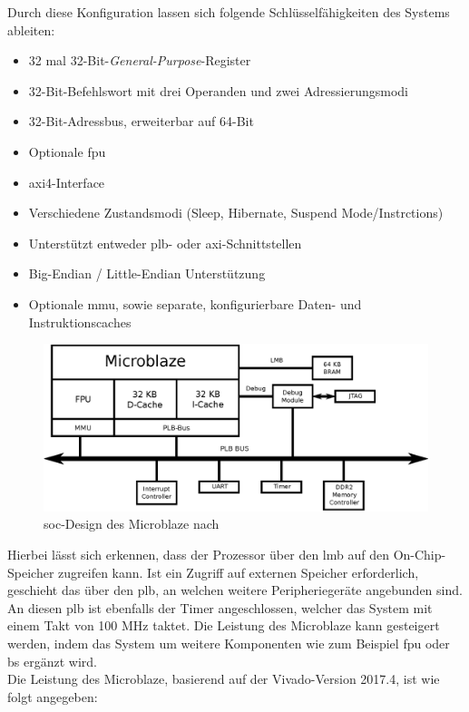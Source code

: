 Durch diese Konfiguration lassen sich folgende Schlüsselfähigkeiten des Systems ableiten:\\
\begin{itemize}
  \item 32 mal 32-Bit-\emph{General-Purpose}-Register
  \item 32-Bit-Befehlswort mit drei Operanden und zwei Adressierungsmodi
  \item 32-Bit-Adressbus, erweiterbar auf 64-Bit
  \item Optionale \ac{fpu}
  \item \ac{axi}4-Interface
  \item Verschiedene Zustandsmodi (Sleep, Hibernate, Suspend Mode/Instrctions)
  \item Unterstützt entweder \ac{plb}- oder \ac{axi}-Schnittstellen
  \item Big-Endian / Little-Endian Unterstützung
  \item Optionale \ac{mmu}, sowie separate, konfigurierbare Daten- und Instruktionscaches
\end{itemize}



\begin{figure}[H]
\centering
\includegraphics[width=1\textwidth]{Hauptteil/microblaze.eps}
\caption{\ac{soc}-Design des Microblaze nach~\cite{comparison}}
\label{fig:microblaze}
\end{figure}

Hierbei lässt sich erkennen, dass der Prozessor über den \ac{lmb} auf den On-Chip-Speicher zugreifen kann. Ist ein Zugriff auf externen Speicher erforderlich,
geschieht das über den \ac{plb}, an welchen weitere Peripheriegeräte angebunden sind. An diesen \ac{plb} ist ebenfalls der Timer angeschlossen, welcher das System mit einem Takt von
100 MHz taktet. Die Leistung des Microblaze kann gesteigert werden, indem das System um weitere Komponenten wie zum Beispiel \ac{fpu} oder \ac{bs} ergänzt wird.\\
\newpage
Die Leistung des Microblaze, basierend auf der Vivado-Version 2017.4, ist wie folgt angegeben:~\cite{microblaze}\\

